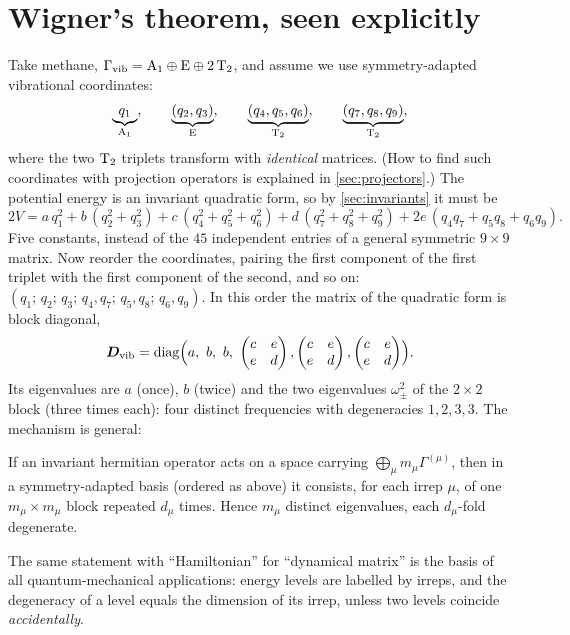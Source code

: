 \section{Wigner's theorem, seen explicitly}\label{sec:wigner}

Take methane, $\Gamma_{\mathrm{vib}}=\mathrm{A}_1\oplus\mathrm{E}\oplus2\,\mathrm{T}_2$, and assume we use
symmetry-adapted vibrational coordinates:
\[
\underbrace{q_1}_{\mathrm{A}_1},\qquad
\underbrace{(q_2,q_3)}_{\mathrm{E}},\qquad
\underbrace{(q_4,q_5,q_6)}_{\mathrm{T}_2},\qquad
\underbrace{(q_7,q_8,q_9)}_{\mathrm{T}_2},
\]
where the two $\mathrm{T}_2$ triplets transform with \emph{identical} matrices. (How to
find such coordinates with projection operators is explained in \cref{sec:projectors}.) The
potential energy is an invariant quadratic form, so by \cref{sec:invariants} it must
be
\begin{equation}\label{eq:VCH4}
  2V=a\,q_1^2+b\,(q_2^2+q_3^2)+c\,(q_4^2+q_5^2+q_6^2)+d\,(q_7^2+q_8^2+q_9^2)
     +2e\,(q_4q_7+q_5q_8+q_6q_9).
\end{equation}
Five constants, instead of the $45$ independent entries of a general symmetric
$9\times9$ matrix. Now reorder the coordinates, pairing the first component of the
first triplet with the first component of the second, and so on:
$(q_1;\,q_2;\,q_3;\,q_4,q_7;\,q_5,q_8;\,q_6,q_9)$. In this order the matrix of the
quadratic form is block diagonal,
\begin{equation}
\bm{D}_{\mathrm{vib}}=
\operatorname{diag}\Bigl(a,\ b,\ b,\
\begin{pmatrix}c&e\\e&d\end{pmatrix},
\begin{pmatrix}c&e\\e&d\end{pmatrix},
\begin{pmatrix}c&e\\e&d\end{pmatrix}\Bigr).
\end{equation}
Its eigenvalues are $a$ (once), $b$ (twice) and the two eigenvalues
$\omega_\pm^2$ of the $2\times2$ block (three times each): four distinct frequencies
with degeneracies $1,2,3,3$. The mechanism is general:

\begin{keyresult}
If an invariant hermitian operator acts on a space carrying
$\bigoplus_\mu m_\mu\Gamma^{(\mu)}$, then in a symmetry-adapted basis (ordered as
above) it consists, for each irrep $\mu$, of one $m_\mu\times m_\mu$ block repeated
$d_\mu$ times. Hence $m_\mu$ distinct eigenvalues, each $d_\mu$-fold degenerate.
\end{keyresult}
The same statement with ``Hamiltonian'' for ``dynamical matrix'' is the basis of all
quantum-mechanical applications: energy levels are labelled by irreps, and the
degeneracy of a level equals the dimension of its irrep, unless two levels coincide
\emph{accidentally}.

